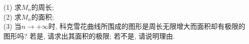 \documentclass[10pt,a4paper]{article}
\begin{document}
\begin{enumerate}[1.]
\begin{center}
\end{center}
(1) 求$M_n$的周长;\\
(2) 求$M_n$的面积;\\
(3) 当$n\to +\infty$时, 科克雪花曲线所围成的图形是周长无限增大而面积却有极限的图形吗? 若是, 请求出其面积的极限; 若不是, 请说明理由.  
\vspace*{3cm}
\end{enumerate}
\end{document}
